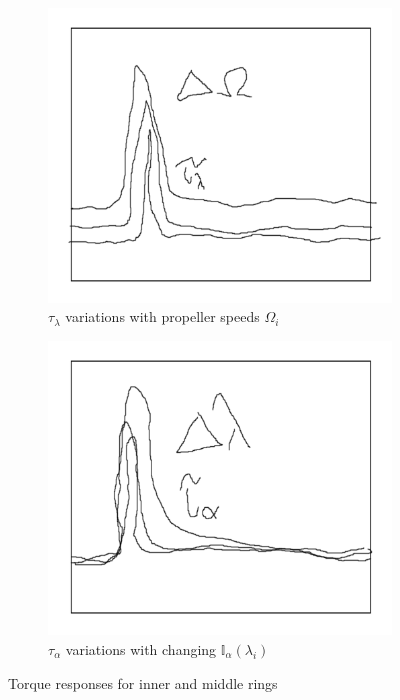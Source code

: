 \begin{figure}[hbtp]
\begin{subfigure}{0.5\textwidth}
\centering
\includegraphics[width=\textwidth]{graphs/tau-lambda}
\caption{$\tau_\lambda$ variations with propeller speeds $\Omega_i$}
\label{fig:tau-lambda}
\end{subfigure}
\begin{subfigure}{0.5\textwidth}
\centering
\includegraphics[width=\textwidth]{graphs/tau-alpha}
\caption{$\tau_\alpha$ variations with changing $\mathbb{I}_\alpha(\lambda_i)$}
\label{fig:tau-alpha}
\end{subfigure}
\vspace{-5pt}
\caption{Torque responses for inner and middle rings}
\vspace{-10pt}
\end{figure}
